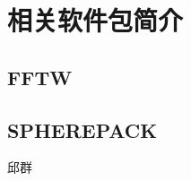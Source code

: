 \section{相关软件包简介}

\subsection{FFTW}

\subsection{SPHEREPACK}

{\color{red}\begin{center}
       邱群
\end{center}}
